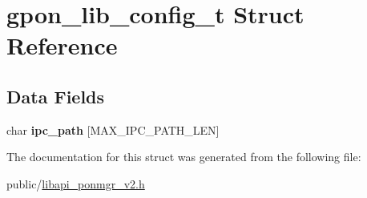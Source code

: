 \hypertarget{structgpon__lib__config__t}{}\section{gpon\+\_\+lib\+\_\+config\+\_\+t Struct Reference}
\label{structgpon__lib__config__t}
\subsection*{Data Fields}
\begin{DoxyCompactItemize}
\item 
\mbox{\label{structgpon__lib__config__t_a1632de4a6a340b2d2b98c9d69a4cda44}} 
char {\bfseries ipc\+\_\+path} \mbox{[}M\+A\+X\+\_\+\+I\+P\+C\+\_\+\+P\+A\+T\+H\+\_\+\+L\+EN\mbox{]}
\end{DoxyCompactItemize}


The documentation for this struct was generated from the following file\+:\begin{DoxyCompactItemize}
\item 
public/\hyperlink{libapi__ponmgr__v2_8h}{libapi\+\_\+ponmgr\+\_\+v2.\+h}\end{DoxyCompactItemize}
